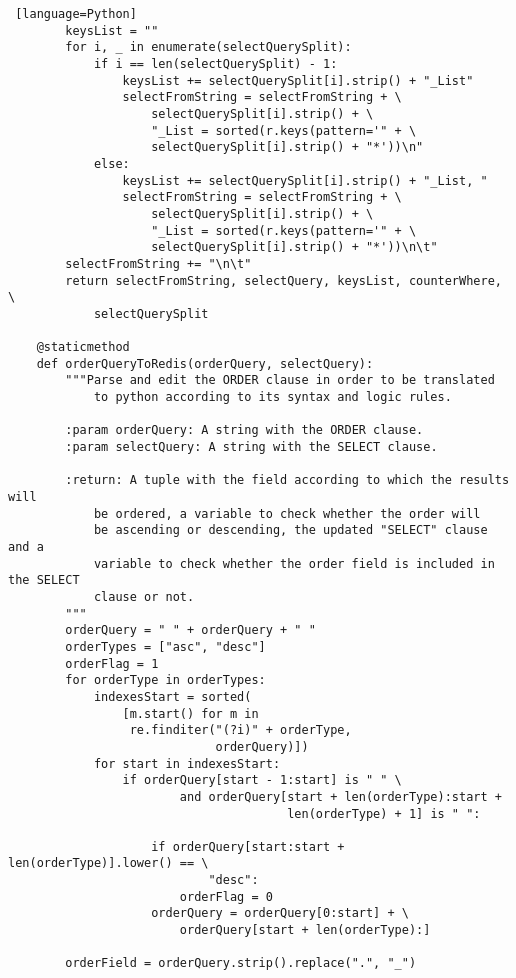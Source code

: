 \documentclass[11pt]{article}
\begin{document}
\begin{lstlisting} [language=Python]
        keysList = ""
        for i, _ in enumerate(selectQuerySplit):
            if i == len(selectQuerySplit) - 1:
                keysList += selectQuerySplit[i].strip() + "_List"
                selectFromString = selectFromString + \
                    selectQuerySplit[i].strip() + \
                    "_List = sorted(r.keys(pattern='" + \
                    selectQuerySplit[i].strip() + "*'))\n"
            else:
                keysList += selectQuerySplit[i].strip() + "_List, "
                selectFromString = selectFromString + \
                    selectQuerySplit[i].strip() + \
                    "_List = sorted(r.keys(pattern='" + \
                    selectQuerySplit[i].strip() + "*'))\n\t"
        selectFromString += "\n\t"
        return selectFromString, selectQuery, keysList, counterWhere, \
            selectQuerySplit

    @staticmethod
    def orderQueryToRedis(orderQuery, selectQuery):
        """Parse and edit the ORDER clause in order to be translated
            to python according to its syntax and logic rules.

        :param orderQuery: A string with the ORDER clause.
        :param selectQuery: A string with the SELECT clause.

        :return: A tuple with the field according to which the results will
            be ordered, a variable to check whether the order will
            be ascending or descending, the updated "SELECT" clause and a
            variable to check whether the order field is included in the SELECT
            clause or not.
        """
        orderQuery = " " + orderQuery + " "
        orderTypes = ["asc", "desc"]
        orderFlag = 1
        for orderType in orderTypes:
            indexesStart = sorted(
                [m.start() for m in
                 re.finditer("(?i)" + orderType,
                             orderQuery)])
            for start in indexesStart:
                if orderQuery[start - 1:start] is " " \
                        and orderQuery[start + len(orderType):start +
                                       len(orderType) + 1] is " ":

                    if orderQuery[start:start + len(orderType)].lower() == \
                            "desc":
                        orderFlag = 0
                    orderQuery = orderQuery[0:start] + \
                        orderQuery[start + len(orderType):]

        orderField = orderQuery.strip().replace(".", "_")


\end{lstlisting}
\end{document}
